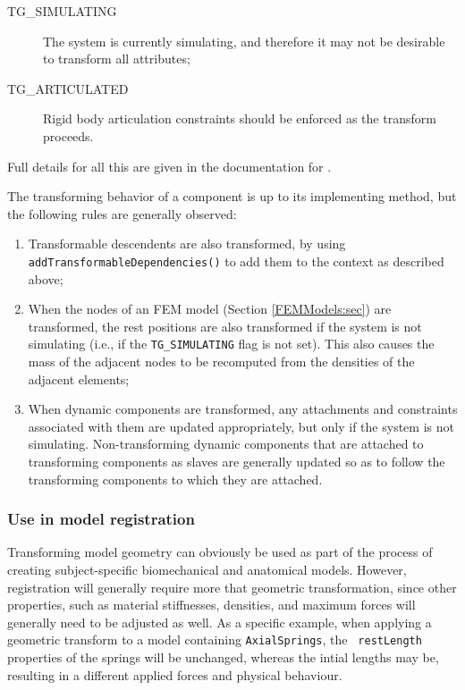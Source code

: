 \begin{description}

\item[TG\_SIMULATING]\mbox{}

The system is currently simulating, and therefore it may not be
desirable to transform all attributes;

\item[TG\_ARTICULATED]\mbox{}

Rigid body articulation constraints should
be enforced as the transform proceeds.

\end{description}

Full details for all this are given in the documentation for
.

The transforming behavior of a component is up to its implementing
method, but the following rules are generally observed:

\begin{enumerate}

\item Transformable descendents are also transformed, by using {\tt
addTransformableDependencies()} to add them to the context as described
above;

\item When the nodes of an FEM model (Section \ref{FEMModels:sec}) are
transformed, the rest positions are also transformed if the system is
not simulating (i.e., if the {\tt TG\_SIMULATING} flag is not set).
This also causes the mass of the adjacent nodes to be recomputed from
the densities of the adjacent elements;

\item When dynamic components are transformed, any attachments and
constraints associated with them are updated appropriately, but only
if the system is not simulating. Non-transforming dynamic components
that are attached to transforming components as slaves are generally
updated so as to follow the transforming components to which they are
attached.

\end{enumerate}

\subsubsection{Use in model registration}

Transforming model geometry can obviously be used as part of the
process of creating subject-specific biomechanical and anatomical
models. However, registration will generally require more that
geometric transformation, since other properties, such as material
stiffnesses, densities, and maximum forces will generally need to be
adjusted as well. As a specific example, when applying a geometric
transform to a model containing {\tt AxialSprings}, the {\tt
restLength} properties of the springs will be unchanged, whereas the
intial lengths may be, resulting in a different applied forces and
physical behaviour.

